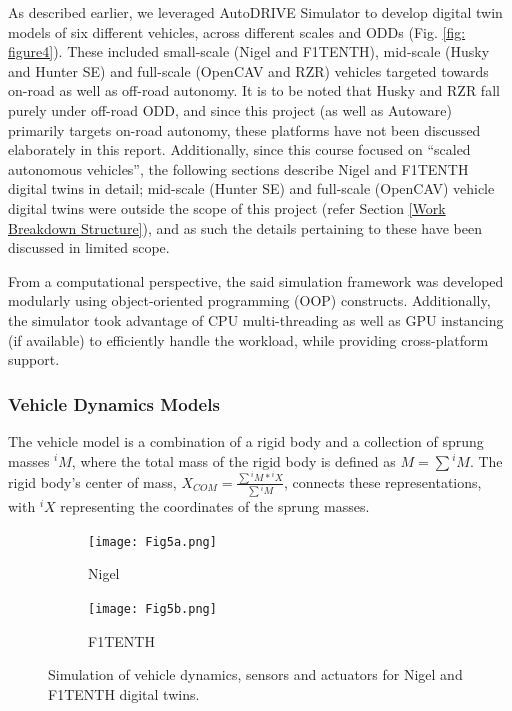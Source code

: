 As described earlier, we leveraged AutoDRIVE Simulator \cite{AutoDRIVESimulator, AutoDRIVESimulatorReport} to develop digital twin models of six different vehicles, across different scales and ODDs (Fig. \ref{fig: figure4}). These included small-scale (Nigel and F1TENTH), mid-scale (Husky and Hunter SE) and full-scale (OpenCAV and RZR) vehicles targeted towards on-road as well as off-road autonomy. It is to be noted that Husky and RZR fall purely under off-road ODD, and since this project (as well as Autoware) primarily targets on-road autonomy, these platforms have not been discussed elaborately in this report. Additionally, since this course focused on ``scaled autonomous vehicles'', the following sections describe Nigel and F1TENTH digital twins in detail; mid-scale (Hunter SE) and full-scale (OpenCAV) vehicle digital twins were outside the scope of this project (refer Section \ref{Work Breakdown Structure}), and as such the details pertaining to these have been discussed in limited scope.

From a computational perspective, the said simulation framework was developed modularly using object-oriented programming (OOP) constructs. Additionally, the simulator took advantage of CPU multi-threading as well as GPU instancing (if available) to efficiently handle the workload, while providing cross-platform support.

\subsubsection{Vehicle Dynamics Models}
\label{Sub-Section: Vehicle Dynamics Models}

The vehicle model is a combination of a rigid body and a collection of sprung masses $^iM$, where the total mass of the rigid body is defined as $M=\sum{^iM}$. The rigid body's center of mass, $X_{COM} = \frac{\sum{{^iM}*{^iX}}}{\sum{^iM}}$, connects these representations, with $^iX$ representing the coordinates of the sprung masses.

\begin{figure}[h]
     \centering
     \begin{subfigure}[b]{0.49\linewidth}
         \centering
         \texttt{[image: Fig5a.png]}
         \caption{Nigel}
         \label{fig5a}
     \end{subfigure}
     \hfill
     \begin{subfigure}[b]{0.49\linewidth}
         \centering
         \texttt{[image: Fig5b.png]}
         \caption{F1TENTH}
         \label{fig5b}
     \end{subfigure}
     \caption{Simulation of vehicle dynamics, sensors and actuators for Nigel and F1TENTH digital twins.}
    \label{figure5}
\end{figure}

